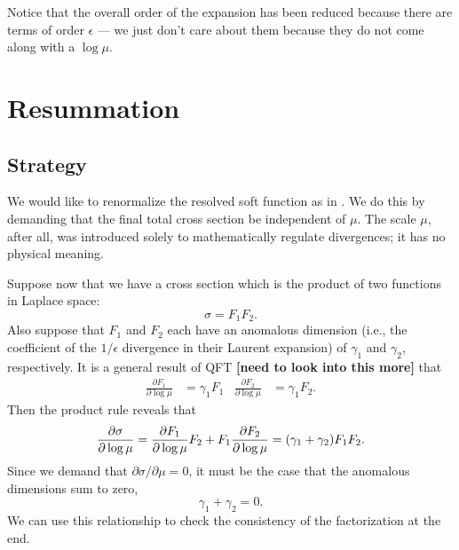 \documentclass[11pt,twoside,reqno]{amsart}
\theoremstyle{plain}
\theoremstyle{remark}
\theoremstyle{definition}
\theoremstyle{remark}
\theoremstyle{definition}
\theoremstyle{definition}
\begin{document}
	Notice that the overall order of the expansion has been reduced because there are terms of order $\epsilon$ --- we just don't care about them because they do not come along with a $\log\mu$.


\section{Resummation}
\subsection{Strategy}
	We would like to renormalize the resolved soft function as in \cite{frye_factorization_2016}. We do this by demanding that the final total cross section be independent of $\mu$. The scale $\mu$, after all, was introduced solely to mathematically regulate divergences; it has no physical meaning.

	Suppose now that we have a cross section which is the product of two functions in Laplace space:
	\begin{equation}
		\sigma = F_1 F_2.
	\end{equation}
	Also suppose that $F_1$ and $F_2$ each have an anomalous dimension (i.e., the coefficient of the $1/\epsilon$ divergence in their Laurent expansion) of $\gamma_1$ and $\gamma_2$, respectively. It is a general result of QFT {\color{red}\textbf{[need to look into this more]}} that \cite{frye_factorization_2016}
	\begin{align}
		\frac{\partial F_1}{\partial \log \mu} &= \gamma_1 F_1 & \frac{\partial F_2}{\partial \log \mu} &= \gamma_1 F_2.
	\end{align}
	Then the product rule reveals that
	\begin{equation}
		\frac{\partial \sigma}{\partial \log \mu} = \frac{\partial F_1}{\partial \log \mu}F_2 + F_1 \frac{\partial F_2}{\partial \log \mu} = \qty(\gamma_1 + \gamma_2) F_1 F_2.
	\end{equation}
	Since we demand that $\partial \sigma /\partial \mu = 0$, it must be the case that the anomalous dimensions sum to zero,
	\begin{equation}
		\gamma_1 + \gamma_2 = 0.
	\end{equation}
	We can use this relationship to check the consistency of the factorization at the end.
\end{document}
